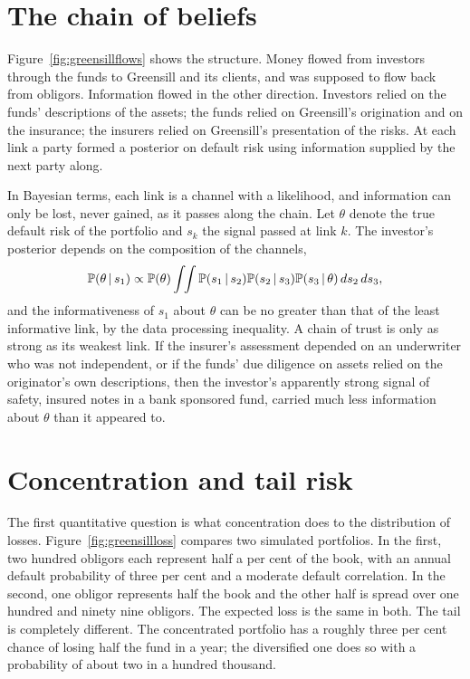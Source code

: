 \section{The chain of beliefs}

Figure~\ref{fig:greensillflows} shows the structure. Money flowed from investors through the funds to Greensill and its clients, and was supposed to flow back from obligors. Information flowed in the other direction. Investors relied on the funds' descriptions of the assets; the funds relied on Greensill's origination and on the insurance; the insurers relied on Greensill's presentation of the risks. At each link a party formed a posterior on default risk using information supplied by the next party along.

In Bayesian terms, each link is a channel with a likelihood, and information can only be lost, never gained, as it passes along the chain. Let $\theta$ denote the true default risk of the portfolio and $s_k$ the signal passed at link $k$. The investor's posterior depends on the composition of the channels,
\begin{equation}
\mathbb{P}(\theta\,\vert\, s_1) \propto \mathbb{P}(\theta) \int\!\!\int \mathbb{P}(s_1\,\vert\, s_2)\mathbb{P}(s_2\,\vert\, s_3)\mathbb{P}(s_3\,\vert\, \theta)\,ds_2\,ds_3,
\end{equation}
and the informativeness of $s_1$ about $\theta$ can be no greater than that of the least informative link, by the data processing inequality. A chain of trust is only as strong as its weakest link. If the insurer's assessment depended on an underwriter who was not independent, or if the funds' due diligence on assets relied on the originator's own descriptions, then the investor's apparently strong signal of safety, insured notes in a bank sponsored fund, carried much less information about $\theta$ than it appeared to.

\section{Concentration and tail risk}

The first quantitative question is what concentration does to the distribution of losses. Figure~\ref{fig:greensillloss} compares two simulated portfolios. In the first, two hundred obligors each represent half a per cent of the book, with an annual default probability of three per cent and a moderate default correlation. In the second, one obligor represents half the book and the other half is spread over one hundred and ninety nine obligors. The expected loss is the same in both. The tail is completely different. The concentrated portfolio has a roughly three per cent chance of losing half the fund in a year; the diversified one does so with a probability of about two in a hundred thousand.

